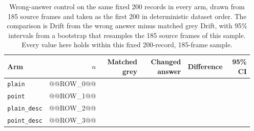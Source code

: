 \begin{table}[ht]
\centering
\caption[Matched wrong-answer control]{Wrong-answer control on the
same fixed 200 records in every arm, drawn from 185 source frames and taken as
the first 200 in deterministic dataset order. The comparison is Drift from the
wrong answer minus matched grey Drift, with 95\% intervals from a bootstrap
that resamples the 185 source frames of this sample. Every value here holds
within this fixed 200-record, 185-frame sample.}
\label{tab:rq2-known-change}
\begin{tabular}{lrrrrr}
\toprule
Arm & $n$ & Matched grey & Changed answer & Difference & 95\% CI \\
\midrule
\texttt{plain} & @@ROW_0@@ \\
\texttt{point} & @@ROW_1@@ \\
\texttt{plain\_desc} & @@ROW_2@@ \\
\texttt{point\_desc} & @@ROW_3@@ \\
\bottomrule
\end{tabular}
\end{table}
